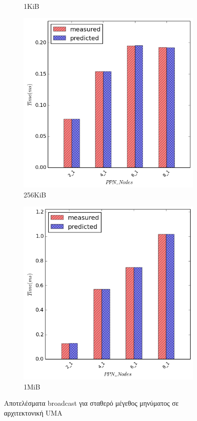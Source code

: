 \begin{figure}[H]
\begin{subfigure}[b]{0.4\textwidth}
        \caption{1KiB}
    \end{subfigure}
    \quad
        \begin{subfigure}[b]{0.4\textwidth}
        \includegraphics[width=\textwidth]{./images/broadcast/bcast_262144.png}
        \caption{256KiB}
    \end{subfigure}
    \quad
        \begin{subfigure}[b]{0.4\textwidth}
        \includegraphics[width=\textwidth]{./images/broadcast/bcast_1048576.png}
        \caption{1MiB}
    \end{subfigure}

    \caption{Αποτελέσματα broadcast για σταθερό μέγεθος μηνύματος σε αρχιτεκτονική UMA}
        \label{fig:bcast_sizes}
\end{figure}
